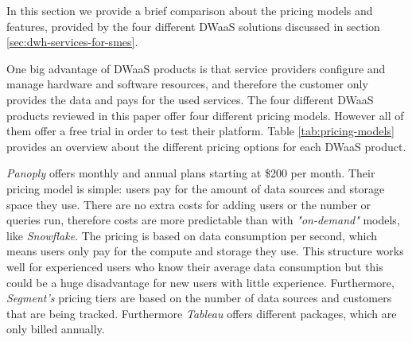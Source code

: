 \documentclass[../paper.tex]{subfiles}
\begin{document}
In this section we provide a brief comparison about the pricing models and features,
provided by the four different DWaaS solutions discussed in section
\ref{sec:dwh-services-for-smes}.

One big advantage of DWaaS products is that service providers configure and manage
hardware and software resources, and therefore the customer only provides the data
and pays for the used services. The four different DWaaS products reviewed in this
paper offer four different pricing models. However all of them offer a free trial in
order to test their platform. Table \ref{tab:pricing-models} provides an overview
about the different pricing options for each DWaaS product.

\textit{Panoply} offers monthly and annual plans starting at \$200 per month. Their
pricing model is simple: users pay for the amount of data sources and storage space
they use. There are no extra costs for adding users or the number or queries run,
therefore costs are more predictable than with \textit{"on-demand"} models, like
\textit{Snowflake}. The pricing is based on data consumption per second, which means
users only pay for the compute and storage they use. This structure works well for
experienced users who know their average data consumption but this could be a huge
disadvantage for new users with little experience. Furthermore, \textit{Segment’s}
pricing tiers are based on the number of data sources and customers that are being
tracked. Furthermore \textit{Tableau} offers different packages, which are only billed
annually.
\end{document}

